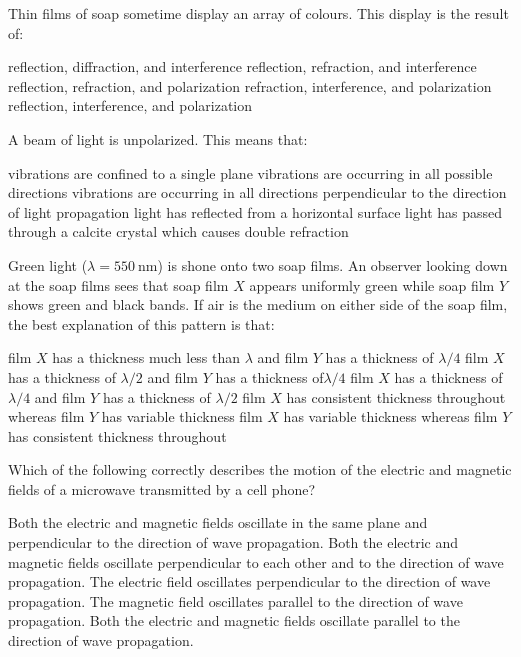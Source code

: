 \documentclass[12pt]{../../ossphysics}
\begin{document}

\begin{questions}
  \question Thin films of soap sometime display an array of colours. This
  display is the result of:
  \begin{choices}
    \choice reflection, diffraction, and interference
    \choice reflection, refraction, and interference
    \choice reflection, refraction, and polarization
    \choice refraction, interference, and polarization
    \choice reflection, interference, and polarization
  \end{choices}

  \question A beam of light is unpolarized. This means that:
  \begin{choices}
    \choice vibrations are confined to a single plane
    \choice vibrations are occurring in all possible directions
    \choice vibrations are occurring in all directions perpendicular to the
    direction of light propagation
    \choice light has reflected from a horizontal surface
    \choice light has passed through a calcite crystal which causes double
    refraction
  \end{choices}

  \question Green light ($\lambda=\SI{550}{\nano\metre}$) is shone onto two soap
  films. An observer looking down at the soap films sees that soap film $X$
  appears uniformly green while soap film $Y$ shows green and black bands. If
  air is the medium on either side of the soap film, the best explanation of
  this pattern is that:
  \begin{choices}
    \choice film $X$ has a thickness much less than $\lambda$ and film $Y$ has
    a thickness of $\lambda/4$
    \choice film $X$ has a thickness of $\lambda/2$ and film $Y$ has a
    thickness of$\lambda/4$
    \choice film $X$ has a thickness of $\lambda/4$ and film $Y$ has a
    thickness of $\lambda/2$
    \choice film $X$ has consistent thickness throughout whereas film $Y$ has
    variable thickness
    \choice film $X$ has variable thickness whereas film $Y$ has consistent
    thickness throughout
  \end{choices}
  
  \question Which of the following correctly describes the motion of the
  electric and magnetic fields of a microwave transmitted by a cell phone?
  \begin{choices}
    \choice Both the electric and magnetic fields oscillate in the same plane
    and perpendicular to the direction of wave propagation.
    \choice Both the electric and magnetic fields oscillate perpendicular to
    each other and to the direction of wave propagation.
    \choice The electric field oscillates perpendicular to the direction of wave
    propagation. The magnetic field oscillates parallel to the direction
    of wave propagation.
    \choice Both the electric and magnetic fields oscillate parallel to the
    direction of wave propagation.
  \end{choices}
  

\end{questions}
\end{document}
